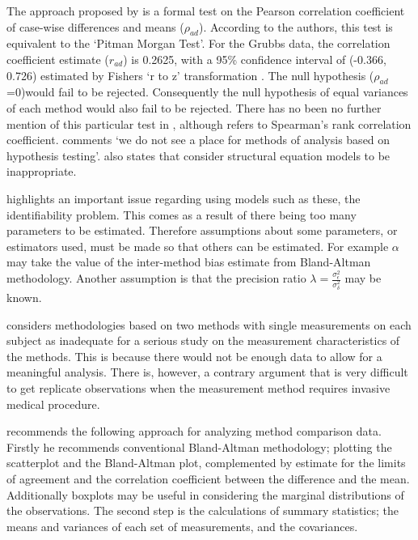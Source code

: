 \documentclass[12pt, a4paper]{report}
\begin{document}
The approach proposed by \citet{BA83} is a formal test on the
Pearson correlation coefficient of case-wise differences and means
($\rho_{ad}$). According to the authors, this test is equivalent
to the `Pitman Morgan Test'. For the Grubbs data, the correlation
coefficient estimate ($r_{ad}$) is 0.2625, with a 95\% confidence
interval of (-0.366, 0.726) estimated by Fishers `r to z'
transformation \citep*{Cohen}. The null hypothesis ($\rho_{ad}$
=0)would fail to be rejected. Consequently the null hypothesis of
equal variances of each method would also fail to be rejected.
There has no been no further mention of this particular test in
\citet{BA86}, although \citet{BA99} refers to Spearman's rank
correlation coefficient. \citet{BA99} comments `we do not see a
place for methods of analysis based on hypothesis testing'.
\citet{BA99} also states that consider structural equation models
to be inappropriate.

\citet{DunnSEME} highlights an important issue regarding using
models such as these, the identifiability problem. This comes as a
result of there being too many parameters to be estimated.
Therefore assumptions about some parameters, or estimators used,
must be made so that others can be estimated. For example $\alpha$
may take the value of the inter-method bias estimate from
Bland-Altman methodology. Another assumption is that the precision
ratio $\lambda=\frac{\sigma^{2}_{\epsilon}}{\sigma^{2}_{\delta}}$
may be known.


\citet{DunnSEME} considers methodologies based on two methods with single measurements on each subject as inadequate for a serious study
on the measurement characteristics of the methods. This is because there would not be enough data to allow for a meaningful analysis.
There is, however, a contrary argument that is very difficult to get replicate
observations when the measurement method requires invasive medical procedure.

\citet{DunnSEME} recommends the following approach for analyzing
method comparison data. Firstly he recommends conventional
Bland-Altman methodology; plotting the scatterplot and the
Bland-Altman plot, complemented by estimate for the limits of
agreement and the correlation coefficient between the difference
and the mean. Additionally boxplots may be useful in considering
the marginal distributions of the observations. The second step is
the calculations of summary statistics; the means and variances of
each set of measurements, and the covariances.
\end{document}
